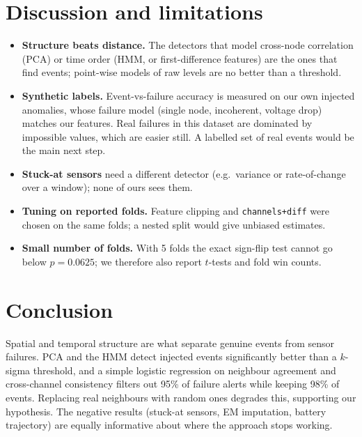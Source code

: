 \documentclass[11pt]{article}
\begin{document}
\section{Discussion and limitations}
\begin{itemize}\itemsep1pt
\item \textbf{Structure beats distance.} The detectors that model cross-node correlation (PCA) or time order (HMM, or first-difference features) are the ones that find events; point-wise models of raw levels are no better than a threshold.
\item \textbf{Synthetic labels.} Event-vs-failure accuracy is measured on our own injected anomalies, whose failure model (single node, incoherent, voltage drop) matches our features. Real failures in this dataset are dominated by impossible values, which are easier still. A labelled set of real events would be the main next step.
\item \textbf{Stuck-at sensors} need a different detector (e.g.\ variance or rate-of-change over a window); none of ours sees them.
\item \textbf{Tuning on reported folds.} Feature clipping and \texttt{channels+diff} were chosen on the same folds; a nested split would give unbiased estimates.
\item \textbf{Small number of folds.} With 5 folds the exact sign-flip test cannot go below $p=0.0625$; we therefore also report $t$-tests and fold win counts.
\end{itemize}

\section{Conclusion}
Spatial and temporal structure are what separate genuine events from sensor failures. PCA and the HMM detect injected events significantly better than a $k$-sigma threshold, and a simple logistic regression on neighbour agreement and cross-channel consistency filters out 95\% of failure alerts while keeping 98\% of events. Replacing real neighbours with random ones degrades this, supporting our hypothesis. The negative results (stuck-at sensors, EM imputation, battery trajectory) are equally informative about where the approach stops working.
\end{document}
